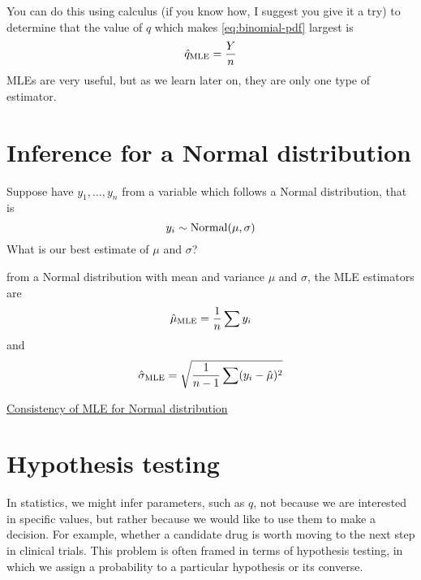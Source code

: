 You can do this using calculus (if you know how, I suggest you give it a try) to determine that the value of $q$ which makes \eqref{eq:binomial-pdf} largest is \begin{equation}
\hat{q}_{\rm MLE} = \frac{Y}{n}
\end{equation}
MLEs are very useful, but as we learn later on, they are only one type of estimator. 




\section{Inference for a Normal distribution}

Suppose have $y_1,\dots,y_n$ from a variable which follows a Normal distribution, that is 
\begin{equation}
y_i \sim {\rm Normal}(\mu,\sigma)
\end{equation}
What is our best estimate of $\mu$ and $\sigma$? 

from a Normal distribution with mean and variance $\mu$ and $\sigma$, the MLE estimators are 
\begin{equation}
\hat{\mu}_{\rm MLE} = \frac{1}{n}\sum y_i
\end{equation}
and 
\begin{equation}
\hat{\sigma}_{\rm MLE} = \sqrt{\frac{1}{n-1}\sum ( y_i - \hat{\mu})^2}
\end{equation}


\begin{exercise}
\href{}{Consistency of MLE for Normal distribution} 
\end{exercise} 



\section{Hypothesis testing}
In statistics, we might infer parameters, such as $q$, not because we are interested in specific values, but rather because we would like to use them to make a decision. For example, whether a candidate drug is worth moving to the next step in clinical trials. This problem is often framed in terms of {\dfn hypothesis testing}, in which we assign a probability to a particular hypothesis or its converse. 

